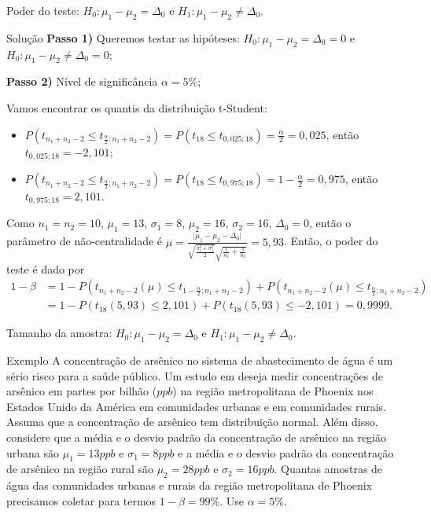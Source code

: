\documentclass[9pt]{beamer}
\begin{document}
\begin{frame}{Poder do teste: $H_0:\mu_1 - \mu_2 = \Delta_0$ e $H_1: \mu_1 - \mu_2 \neq \Delta_0$.}

\begin{block}{Solução}
	\textbf{Passo 1)} Queremos testar as hipóteses: $H_0: \mu_1 - \mu_2 = \Delta_0 = 0$ e $H_0: \mu_1 - \mu_2 \neq \Delta_0 = 0$;
	
	\textbf{Passo 2)} Nível de significância $\alpha=5\%$;
	
	Vamos encontrar os quantis da distribuição t-Student:
	\begin{itemize}
		\item $P(t_{n_1+n_2-2} \leq t_{\frac{\alpha}{2}; n_1+n_2-2}) = P(t_{18} \leq t_{0,025; 18})=\frac{\alpha}{2} = 0,025$, então $t_{0,025; 18} = -2,101$;
		\item $P(t_{n_1+n_2-2} \leq t_{\frac{\alpha}{2}; n_1+n_2-2}) = P(t_{18} \leq t_{0,975; 18})=1-\frac{\alpha}{2} = 0,975$, então $t_{0,975; 18} = 2,101$.
	\end{itemize}

	Como $n_1=n_2=10$, $\mu_1=13$, $\sigma_1=8$, $\mu_2=16$, $\sigma_2=16$, $\Delta_0 = 0$, então o parâmetro de não-centralidade é $\mu = \frac{\lvert\mu_1 - \mu_2 - \Delta_0\rvert}{\sqrt{\frac{\sigma_1^2 + \sigma_1^2}{2}} \sqrt{\frac{1}{n_1} + \frac{1}{n_2}}} = 5,93$. Então, o poder do teste é dado por
	\begin{align*}
	1-\beta &= 1 - P\left( t_{n_1+n_2-2}\left(\mu \right) \leq t_{1-\frac{\alpha}{2};n_1+n_2-2} \right)+P\left( t_{n_1+n_2-2}\left( \mu \right) \leq t_{\frac{\alpha}{2};n_1+n_2-2} \right)\\
	&= 1 - P (t_{18}(5,93) \leq 2,101) + P (t_{18}(5,93) \leq -2,101) = 0,9999.
	\end{align*}
\end{block}
\end{frame}

\begin{frame}{Tamanho da amostra: $H_0:\mu_1 - \mu_2 = \Delta_0$ e $H_1: \mu_1 - \mu_2 \neq \Delta_0$.}

\begin{block}{Exemplo}
	A concentração de arsênico no sistema de abastecimento de água é um sério risco para a saúde público. Um estudo em deseja medir concentrações de arsênico em partes por bilhão ($ppb$) na região metropolitana de Phoenix nos Estados Unido da América em comunidades urbanas e em comunidades rurais. Assuma que a concentração de arsênico tem distribuição normal. Além disso, considere que a média e o desvio padrão da concentração de arsênico na região urbana são $\mu_1 = 13 ppb$ e $\sigma_1=8 ppb$ e a média e o desvio padrão da concentração de arsênico na região rural são $\mu_2=28 ppb$ e $\sigma_2=16 ppb$. Quantas amostras de água das comunidades urbanas e rurais da região metropolitana de Phoenix precisamos coletar para termos $1-\beta=99\%$. Use $\alpha=5\%$.	
\end{block}
\end{frame}
\end{document}
